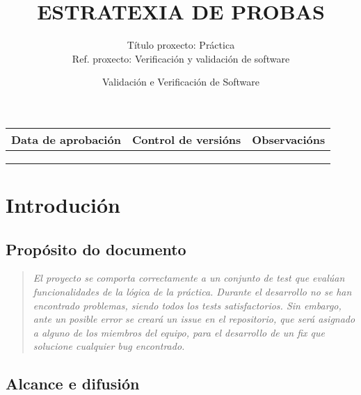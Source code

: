 \documentclass[DIV=calc,paper=a4,fontsize=11pt,onecolumn]{scrartcl}	 %
\title{ESTRATEXIA DE PROBAS} %
\author{Título proxecto: Práctica \\
        Ref. proxecto: Verificación y validación de software}
\date{\sffamily Validación e Verificación de Software} %
\newcommand{\hint}[1]{\begin{quote}\itshape #1 \end{quote}}
\begin{document}
\maketitle %
\thispagestyle{fancy} %


\vspace*{1cm}

\begin{center}
\small \sffamily
\begin{tabular}{c|c|c}
Data de aprobación & Control de versións & Observacións \\ \hline
& & \\ \hline
& & \\ \hline
& & \\
\end{tabular}
\end{center}

\clearpage


\section{Introdución}

\subsection{Propósito do documento}

\hint{El proyecto se comporta correctamente a un conjunto de test que evalúan funcionalidades de la lógica de la práctica. Durante el desarrollo no se han encontrado problemas, siendo todos los tests satisfactorios. Sin embargo, ante un posible error se creará un issue en el repositorio, que será asignado a alguno de los miembros del equipo, para el desarrollo de un fix que solucione cualquier bug encontrado.}

\subsection{Alcance e difusión}
\end{document}
